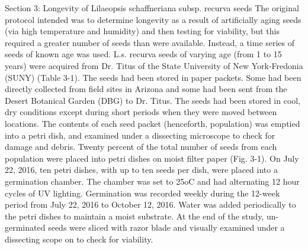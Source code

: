 \documentclass[twocolumn]{article}
\begin{document}
Section 3: Longevity of Lilaeopsis schaffneriana subsp. recurva seeds
The original protocol intended was to determine longevity as a result of artificially aging seeds (via high temperature and humidity) and then testing for viability, but this required a greater number of seeds than were available. Instead, a time series of seeds of known age was used. L.s. recurva seeds of varying age (from 1 to 15 years) were acquired from Dr. Titus of the State University of New York-Fredonia (SUNY) (Table 3-1). The seeds had been stored in paper packets. Some had been directly collected from field sites in Arizona and some had been sent from the Desert Botanical Garden (DBG) to Dr. Titus. The seeds had been stored in cool, dry conditions except during short periods when they were moved between locations. The contents of each seed packet (henceforth, population) was emptied into a petri dish, and examined under a dissecting microscope to check for damage and debris. Twenty percent of the total number of seeds from each population were placed into petri dishes on moist filter paper (Fig. 3-1). On July 22, 2016, ten petri dishes, with up to ten seeds per dish, were placed into a germination chamber. The chamber was set to 25oC and had alternating 12 hour cycles of UV lighting. Germination was recorded weekly during the 12-week period from July 22, 2016 to October 12, 2016. Water was added periodically to the petri dishes to maintain a moist substrate. At the end of the study, un-germinated seeds were sliced with razor blade and visually examined under a dissecting scope on to check for viability. 
\end{document}
